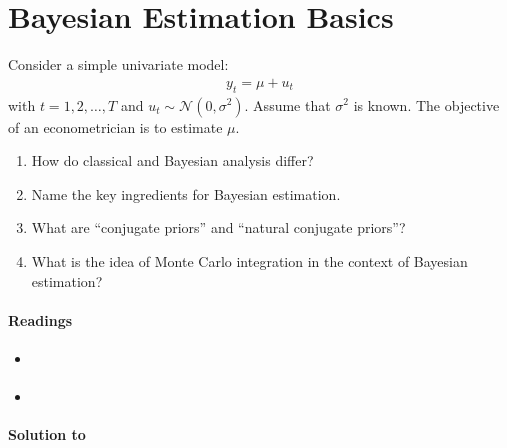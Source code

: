 \section[Bayesian Estimation Basics]{Bayesian Estimation Basics\label{ex:BayesianEstimationBasics}}
Consider a simple univariate model:
\begin{align*}
y_t = \mu + u_t
\end{align*}
with \(t = 1, 2,\ldots , T\) and \(u_t \sim \mathcal{N}(0,\sigma^2)\).
Assume that \(\sigma^2\) is known.
The objective of an econometrician is to estimate \(\mu\).
\begin{enumerate}
\item How do classical and Bayesian analysis differ?
\item Name the key ingredients for Bayesian estimation.
\item What are \enquote{conjugate priors} and \enquote{natural conjugate priors}?
\item What is the idea of Monte Carlo integration in the context of Bayesian estimation?
\end{enumerate}

\paragraph{Readings}
\begin{itemize}
\item \textcite[Part I]{Greenberg_2008_IntroductionBayesianEconometrics}
\item \textcite[Ch.1-2]{Koop_2003_BayesianEconometrics} 
\end{itemize}

\begin{solution}\textbf{Solution to }
\ifDisplaySolutions

\fi
\newpage
\end{solution}